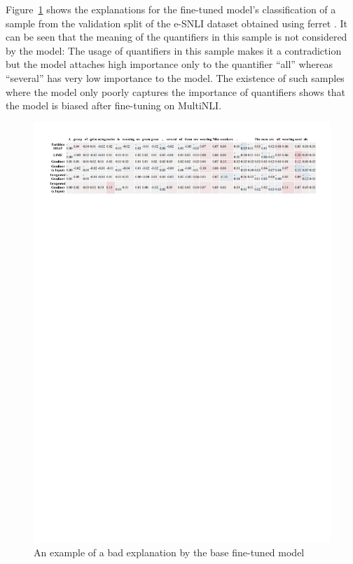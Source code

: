 Figure~\ref{fig:ferret-sample} shows the explanations for the fine-tuned model's classification of a sample from the validation split of the \ac{e-SNLI} dataset obtained using ferret \cite{ferret}. It can be seen that the meaning of the quantifiers in this sample is not considered by the model: The usage of quantifiers in this sample makes it a contradiction but the model attaches high importance only to the quantifier \enquote{all} whereas \enquote{several} has very low importance to the model. The existence of such samples where the model only poorly captures the importance of quantifiers shows that the model is biased after fine-tuning on \ac{MultiNLI}.

\begin{figure}[t!]
    \centering
    \includegraphics[width=\textwidth]{./images/ferret_sample.pdf}
    \caption{An example of a bad explanation by the base fine-tuned model}
    \label{fig:ferret-sample}
\end{figure}

